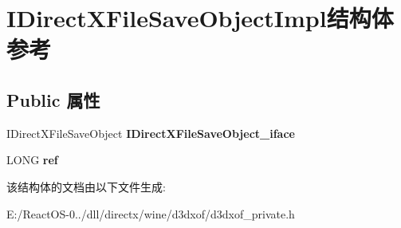\hypertarget{struct_i_direct_x_file_save_object_impl}{}\section{I\+Direct\+X\+File\+Save\+Object\+Impl结构体 参考}
\label{struct_i_direct_x_file_save_object_impl}
\subsection*{Public 属性}
\begin{DoxyCompactItemize}
\item 
\mbox{\label{struct_i_direct_x_file_save_object_impl_ac04c98dc1c0e9f378c1dad5bc083cabd}} 
I\+Direct\+X\+File\+Save\+Object {\bfseries I\+Direct\+X\+File\+Save\+Object\+\_\+iface}
\item 
\mbox{\label{struct_i_direct_x_file_save_object_impl_ad744edcad7ef39f0ea83273318f143ae}} 
L\+O\+NG {\bfseries ref}
\end{DoxyCompactItemize}


该结构体的文档由以下文件生成\+:\begin{DoxyCompactItemize}
\item 
E\+:/\+React\+O\+S-\/0../dll/directx/wine/d3dxof/d3dxof\+\_\+private.\+h\end{DoxyCompactItemize}
